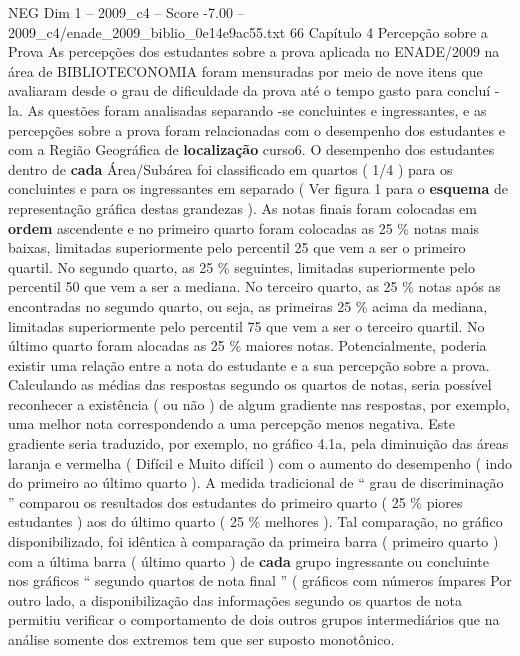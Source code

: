 \begin{textsample}{NEG Dim 1 – 2009\_c4 – Score -7.00 – 2009\_c4/enade\_2009\_biblio\_0e14e9ac55.txt}  \label{ex:f1_neg_030}
66 Capítulo 4 Percepção sobre a Prova As percepções dos estudantes sobre a prova aplicada no ENADE/2009 na área de BIBLIOTECONOMIA foram mensuradas por meio de nove itens que avaliaram desde o grau de dificuldade da prova até o tempo gasto para concluí -la.
As questões foram analisadas separando -se concluintes e ingressantes, e as percepções sobre a prova foram relacionadas com o desempenho dos estudantes e com a Região Geográfica de \textbf{localização} curso6.
O desempenho dos estudantes dentro de \textbf{cada} Área/Subárea foi classificado em quartos ( 1/4 ) para os concluintes e para os ingressantes em separado ( Ver figura 1 para o \textbf{esquema} de representação gráfica destas grandezas ).
As notas finais foram colocadas em \textbf{ordem} ascendente e no primeiro quarto foram colocadas as 25 \% notas mais baixas, limitadas superiormente pelo percentil 25 que vem a ser o primeiro quartil.
No segundo quarto, as 25 \% seguintes, limitadas superiormente pelo percentil 50 que vem a ser a mediana.
No terceiro quarto, as 25 \% notas após as encontradas no segundo quarto, ou seja, as primeiras 25 \% acima da mediana, limitadas superiormente pelo percentil 75 que vem a ser o terceiro quartil.
No último quarto foram alocadas as 25 \% maiores notas.
Potencialmente, poderia existir uma relação entre a nota do estudante e a sua percepção sobre a prova.
Calculando as médias das respostas segundo os quartos de notas, seria possível reconhecer a existência ( ou não ) de algum gradiente nas respostas, por exemplo, uma melhor nota correspondendo a uma percepção menos negativa.
Este gradiente seria traduzido, por exemplo, no gráfico 4.1a, pela diminuição das áreas laranja e vermelha ( Difícil e Muito difícil ) com o aumento do desempenho ( indo do primeiro ao último quarto ).
A medida tradicional de “ grau de discriminação ” comparou os resultados dos estudantes do primeiro quarto ( 25 \% piores estudantes ) aos do último quarto ( 25 \% melhores ).
Tal comparação, no gráfico disponibilizado, foi idêntica à comparação da primeira barra ( primeiro quarto ) com a última barra ( último quarto ) de \textbf{cada} grupo ingressante ou concluinte nos gráficos “ segundo quartos de nota final ” ( gráficos com números ímpares Por outro lado, a disponibilização das informações segundo os quartos de nota permitiu verificar o comportamento de dois outros grupos intermediários que na análise somente dos extremos tem que ser suposto monotônico.

\end{textsample}

